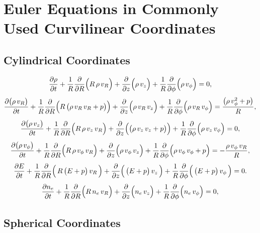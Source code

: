 \documentclass[10pt,preprint]{aastex}
\begin{document}


\appendix

\section{Euler Equations in Commonly Used Curvilinear Coordinates}
\label{app:CurvilinearEuler}

\subsection{Cylindrical Coordinates}

\begin{equation}
  \frac{\partial \rho}{\partial t}
  +\frac{1}{R}\frac{\partial }{\partial R}\Big(R\,\rho\,v_{R}\Big)
  +\frac{\partial }{\partial z}\Big(\rho\,v_{z}\Big)
  +\frac{1}{R}\frac{\partial }{\partial \phi}\Big(\rho\,v_{\phi}\Big)=0,
\end{equation}
\begin{equation}
  \frac{\partial \big(\rho\,v_{R}\big)}{\partial t}
  +\frac{1}{R}\frac{\partial }{\partial R}\Big(R\,\big(\rho\,v_{R}\,v_{R}+p\big)\Big)
  +\frac{\partial }{\partial z}\Big(\rho\,v_{R}\,v_{z}\Big)
  +\frac{1}{R}\frac{\partial }{\partial \phi}\Big(\rho\,v_{R}\,v_{\phi}\Big)
  =\frac{\big(\rho\,v_{\phi}^{2}+p\big)}{R},
\end{equation}
\begin{equation}
  \frac{\partial \big(\rho\,v_{z}\big)}{\partial t}
  +\frac{1}{R}\frac{\partial }{\partial R}\Big(R\,\rho\,v_{z}\,v_{R}\Big)
  +\frac{\partial }{\partial z}\Big(\big(\rho\,v_{z}\,v_{z}+p\big)\Big)
  +\frac{1}{R}\frac{\partial }{\partial \phi}\Big(\rho\,v_{z}\,v_{\phi}\Big)=0,
\end{equation}
\begin{equation}
  \frac{\partial \big(\rho\,v_{\phi}\big)}{\partial t}
  +\frac{1}{R}\frac{\partial }{\partial R}\Big(R\,\rho\,v_{\phi}\,v_{R}\Big)
  +\frac{\partial }{\partial z}\Big(\rho\,v_{\phi}\,v_{z}\Big)
  +\frac{1}{R}\frac{\partial }{\partial \phi}\Big(\rho\,v_{\phi}\,v_{\phi}+p\Big)
  =-\frac{\rho\,v_{\phi}\,v_{R}}{R},
\end{equation}
\begin{equation}
  \frac{\partial E}{\partial t}+\frac{1}{R}\frac{\partial }{\partial R}\Big(\,R\,\big(E+p\big)\,v_{R}\,\Big)+\frac{\partial }{\partial z}\Big(\,\big(E+p\big)\,v_{z}\,\Big)+\frac{1}{R}\frac{\partial }{\partial \phi}\Big(\,\big(E+p\big)\,v_{\phi}\,\Big)=0.
\end{equation}
\begin{equation}
  \frac{\partial n_{e}}{\partial t}
  +\frac{1}{R}\frac{\partial }{\partial R}\Big(R\,n_{e}\,v_{R}\Big)
  +\frac{\partial }{\partial z}\Big(n_{e}\,v_{z}\Big)
  +\frac{1}{R}\frac{\partial }{\partial \phi}\Big(n_{e}\,v_{\phi}\Big)=0,
\end{equation}

\subsection{Spherical Coordinates}
\end{document}
